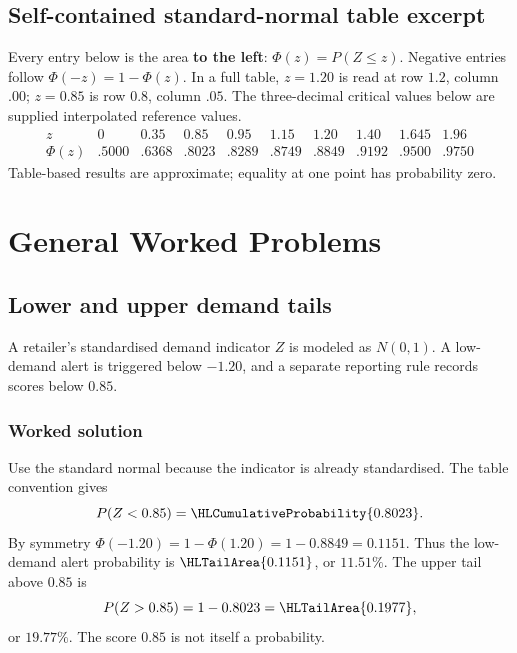 \subsection{Self-contained standard-normal table excerpt}
Every entry below is the area \textbf{to the left}: $\Phi(z)=P(Z\le z)$. Negative entries follow $\Phi(-z)=1-\Phi(z)$. In a full table, $z=1.20$ is read at row $1.2$, column $.00$; $z=0.85$ is row $0.8$, column $.05$. The three-decimal critical values below are supplied interpolated reference values.
\[
\begin{array}{c|rrrrrrrrr}
z&0&0.35&0.85&0.95&1.15&1.20&1.40&1.645&1.96\\\hline
\Phi(z)&.5000&.6368&.8023&.8289&.8749&.8849&.9192&.9500&.9750
\end{array}
\]
Table-based results are approximate; equality at one point has probability zero.
\section{General Worked Problems}\label{sec:general-worked}

\subsection{Lower and upper demand tails}\label{prob:sec:general-worked0}
A retailer's standardised demand indicator $Z$ is modeled as $N(0,1)$. A low-demand alert is triggered below $-1.20$, and a separate reporting rule records scores below $0.85$.
\subsubsection*{Worked solution}\label{sol:sec:general-worked0}
Use the standard normal because the indicator is already standardised. The table convention gives
\[
P(Z<0.85)=\HLCumulativeProbability{0.8023}.
\]
By symmetry $\Phi(-1.20)=1-\Phi(1.20)=1-0.8849=0.1151$. Thus the low-demand alert probability is $\HLTailArea{0.1151}$, or $11.51\%$. The upper tail above $0.85$ is
\[
P(Z>0.85)=1-0.8023=\HLTailArea{0.1977},
\]
or $19.77\%$. The score $0.85$ is not itself a probability.


